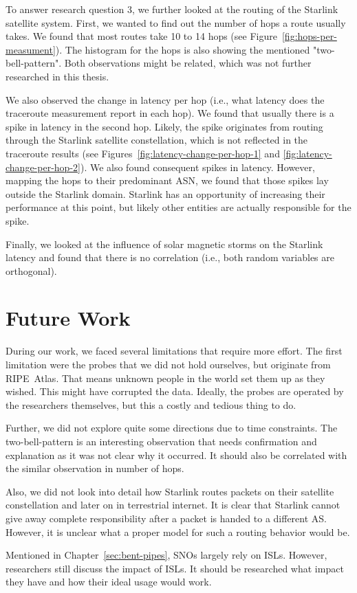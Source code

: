 To answer research question 3, we further looked at the routing of the Starlink
satellite system. First, we wanted to find out the number of hops a route
usually takes. We found that most routes take 10 to 14 hops (see
Figure~\ref{fig:hops-per-measument}). The histogram for the hops is also
showing the mentioned "two-bell-pattern". Both observations might be related,
which was not further researched in this thesis.

We also observed the change in latency per hop (i.e., what latency does the
traceroute measurement report in each hop). We found that usually there is a
spike in latency in the second hop. Likely, the spike originates from routing
through the Starlink satellite constellation, which is not reflected in the
traceroute results (see Figures~\ref{fig:latency-change-per-hop-1} and
\ref{fig:latency-change-per-hop-2}). We also found consequent spikes in
latency. However, mapping the hops to their predominant ASN, we found that
those spikes lay outside the Starlink domain. Starlink has an opportunity of
increasing their performance at this point, but likely other entities are
actually responsible for the spike.

Finally, we looked at the influence of solar magnetic storms on the Starlink
latency and found that there is no correlation (i.e., both random
variables are orthogonal).

\section{Future Work}

During our work, we faced several limitations that require more effort. The
first limitation were the probes that we did not hold ourselves, but originate
from RIPE~Atlas. That means unknown people in the world set them up as they
wished. This might have corrupted the data. Ideally, the probes are operated by
the researchers themselves, but this a costly and tedious thing to do.

Further, we did not explore quite some directions due to time constraints. The
two-bell-pattern is an interesting observation that needs confirmation and
explanation as it was not clear why it occurred. It should also be correlated
with the similar observation in number of hops.

Also, we did not look into detail how Starlink routes packets on their
satellite constellation and later on in terrestrial internet. It is clear that
Starlink cannot give away complete responsibility after a packet is handed to a
different AS. However, it is unclear what a proper model for such a routing
behavior would be.

Mentioned in Chapter~\ref{sec:bent-pipes}, \ac{SNO}s largely rely on \ac{ISL}s.
However, researchers still discuss the impact of \ac{ISL}s. It should be
researched what impact they have and how their ideal usage would work.
